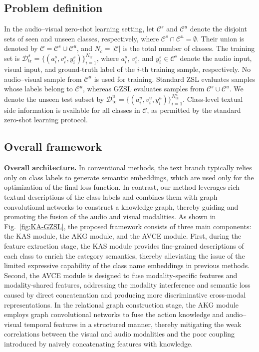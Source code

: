 \documentclass[lettersize,journal]{IEEEtran}
\begin{document}
\subsection{Problem definition}
In the audio--visual zero-shot learning setting, let $\mathcal{C}^{s}$ and $\mathcal{C}^{u}$ denote the disjoint sets of seen and unseen classes, respectively, where $\mathcal{C}^{s}\cap\mathcal{C}^{u}=\emptyset$. Their union is denoted by $\mathcal{C}=\mathcal{C}^{s}\cup\mathcal{C}^{u}$, and $N_c=|\mathcal{C}|$ is the total number of classes. The training set is $\mathcal{D}_{\mathrm{tr}}^{s}=\{(a_i^{s},v_i^{s},y_i^{s})\}_{i=1}^{N_{\mathrm{tr}}}$, where $a_i^{s}$, $v_i^{s}$, and $y_i^{s}\in\mathcal{C}^{s}$ denote the audio input, visual input, and ground-truth label of the $i$-th training sample, respectively. No audio--visual sample from $\mathcal{C}^{u}$ is used for training. Standard ZSL evaluates samples whose labels belong to $\mathcal{C}^{u}$, whereas GZSL evaluates samples from $\mathcal{C}^{s}\cup\mathcal{C}^{u}$. We denote the unseen test subset by $\mathcal{D}_{\mathrm{te}}^{u}=\{(a_i^{u},v_i^{u},y_i^{u})\}_{i=1}^{N_{\mathrm{te}}^{u}}$. Class-level textual side information is available for all classes in $\mathcal{C}$, as permitted by the standard zero-shot learning protocol.



\subsection{Overall framework}
\textbf{Overall architecture.} In conventional methods, the text branch typically relies only on class labels to generate semantic embeddings, which are used only for the optimization of the final loss function. In contrast, our method leverages rich textual descriptions of the class labels and combines them with graph convolutional networks to construct a knowledge graph, thereby guiding and promoting the fusion of the audio and visual modalities. As shown in Fig.~\ref{fig:KA-GZSL}, the proposed framework consists of three main components: the KAS module, the AKG module, and the AVCE module. First, during the feature extraction stage, the KAS module provides fine-grained descriptions of each class to enrich the category semantics, thereby alleviating the issue of the limited expressive capability of the class name embeddings in previous methods. Second, the AVCE module is designed to fuse modality-specific features and modality-shared features, addressing the modality interference and semantic loss caused by direct concatenation and producing more discriminative cross-modal representations. In the relational graph construction stage, the AKG module employs graph convolutional networks to fuse the action knowledge and audio–visual temporal features in a structured manner, thereby mitigating the weak correlations between the visual and audio modalities and the poor coupling introduced by naively concatenating features with knowledge.
\end{document}
